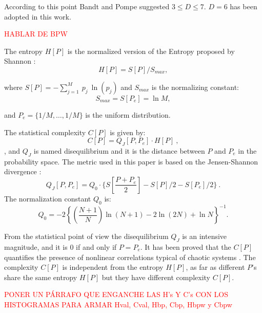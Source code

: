 According to this point Bandt and Pompe suggested $3\leq D \leq 7$. $D=6$ has been adopted in this work.

\textcolor{red}{HABLAR DE BPW}

The entropy $H[P]$ is the normalized version of the Entropy proposed by Shannon \cite{Shannon1948}:%
%
\begin{equation}\label{eq:sha}
H[P] = S[P] /S_{max},
\end{equation}

\noindent where $S[P]=-\sum _{j=1}^{M}~p_j~\ln( p_j )$ and $S_{max}$ is the normalizing constant:%
%
\begin{equation}
\label{eq:Smax} S_{max}= S[P_e] = \ln M,
\end{equation}

\noindent and $P_e=\{ 1/M, \dots,1/M\}$ is the uniform distribution.

The statistical complexity $C[P]$ is given by:
\begin{equation}
\label{eq:inten}
C[{P}]=Q_{J}[{P,P_e}]\cdot H[{P}] \ ,
\end{equation}
, and
$Q_{J}$ is named disequilibrium and it is the distance between $P$ and $P_e$ in the probability space.
The metric used in this paper is based on the Jensen-Shannon divergence \cite{Lamberti2004}:%
%
\begin{equation}
\label{eq:disequi}
Q_{J}[{P,P_e}]= Q_0 \cdot \{S[\frac{P+P_e}{2}]-S[P]/2-S[P_e]/2 \} \ .
\end{equation}
%
\noindent The normalization constant $Q_0$ is:
\begin{equation}
\label{eq:q0j}
Q_0=-2 \left\{ \left( \frac{N+1}{N} \right) \ln(N+1) - 2 \ln(2N) + \ln N \right\}^{-1} .
\end{equation}

From the statistical point of view the disequilibrium $Q_J$ is an intensive magnitude, and it is $0$ if and only if $P=P_e$.
It has been proved that the $C[P]$ quantifies the presence of nonlinear correlations typical of chaotic systems \cite{Martin2003,Lamberti2004}.
The complexity $C[P]$ is independent from the entropy $H[P]$, as far as different $P$'s share the same entropy $H[P]$ but they have different complexity $C[P]$.

\textcolor{red}{PONER UN PÁRRAFO QUE ENGANCHE LAS H's Y C's CON LOS HISTOGRAMAS PARA ARMAR Hval, Cval, Hbp, Cbp, Hbpw y Cbpw}

